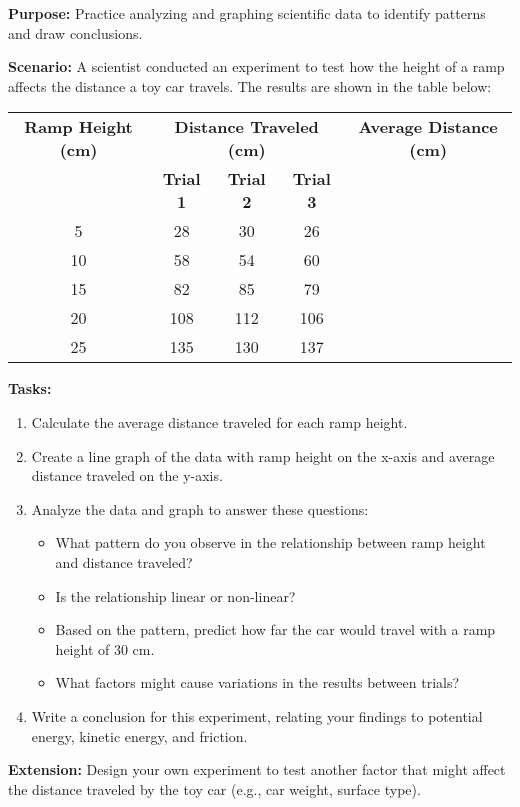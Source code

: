 \documentclass[justified,notoc]{tufte-book}
\newenvironment{investigation}[1]{%
    \begin{tcolorbox}[colback=info!10,colframe=info,title=\textbf{Investigation: #1}]
}{%
    \end{tcolorbox}
}
\begin{document}
\begin{investigation}{Analyzing and Graphing Scientific Data}
\textbf{Purpose:} Practice analyzing and graphing scientific data to identify patterns and draw conclusions.

\textbf{Scenario:} A scientist conducted an experiment to test how the height of a ramp affects the distance a toy car travels. The results are shown in the table below:

\begin{center}
\begin{tabular}{|c|c|c|c|c|}
\hline
\textbf{Ramp Height (cm)} & \multicolumn{3}{c|}{\textbf{Distance Traveled (cm)}} & \textbf{Average Distance (cm)} \\
\cline{2-4}
 & \textbf{Trial 1} & \textbf{Trial 2} & \textbf{Trial 3} & \\
\hline
5 & 28 & 30 & 26 & \\
\hline
10 & 58 & 54 & 60 & \\
\hline
15 & 82 & 85 & 79 & \\
\hline
20 & 108 & 112 & 106 & \\
\hline
25 & 135 & 130 & 137 & \\
\hline
\end{tabular}
\end{center}

\textbf{Tasks:}
\begin{enumerate}
    \item Calculate the average distance traveled for each ramp height.
    
    \item Create a line graph of the data with ramp height on the x-axis and average distance traveled on the y-axis.
    
    \item Analyze the data and graph to answer these questions:
    \begin{itemize}
        \item What pattern do you observe in the relationship between ramp height and distance traveled?
        \item Is the relationship linear or non-linear?
        \item Based on the pattern, predict how far the car would travel with a ramp height of 30 cm.
        \item What factors might cause variations in the results between trials?
    \end{itemize}
    
    \item Write a conclusion for this experiment, relating your findings to potential energy, kinetic energy, and friction.
\end{enumerate}

\textbf{Extension:} Design your own experiment to test another factor that might affect the distance traveled by the toy car (e.g., car weight, surface type).
\end{investigation}
\end{document}
